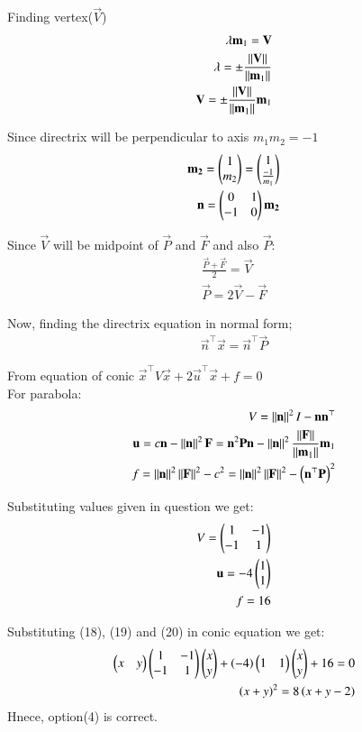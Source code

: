 \documentclass[journal]{IEEEtran}
\begin{document}
Finding vertex($\vec{V}$)
\begin{align}
    \lambda\mathbf{m}_1=\mathbf{V}\\
    \lambda = \pm\frac{\left\lVert\mathbf{V}\right\rVert}{\left\lVert\mathbf{m}_1\right\rVert}\\
    \mathbf{V} = \pm\frac{\left\lVert\mathbf{V}\right\rVert}{\left\lVert\mathbf{m}_1\right\rVert}\mathbf{m}_1
\end{align}

Since directrix will be perpendicular to axis $m_1m_2=-1$
\begin{align}
    \mathbf{m_2} = \begin{pmatrix}1\\m_2\end{pmatrix} = \begin{pmatrix}1\\ \frac{-1}{m_1}\end{pmatrix}\\
    \mathbf{n} = \begin{pmatrix}0&1\\-1&0\end{pmatrix}\mathbf{m_2}
\end{align}

Since $\vec{V}$ will be midpoint of $\vec{P}$ and $\vec{F}$ and also $\vec{P}$:
\begin{align}
    \frac{\vec{P}+\vec{F}}{2} = \vec{V}\\
    \vec{P}=2\vec{V}-\vec{F}
\end{align}

Now, finding the directrix equation in normal form;
\begin{align}
    \vec{n}^\top\vec{x}=\vec{n}^\top\vec{P}
\end{align}

From equation of conic $\vec{x}^\top V\vec{x}+2\vec{u}^\top\vec{x}+f=0$\\
For parabola:
\begin{align}
    V=\left\lVert\mathbf{n}\right\rVert^2I-\mathbf{n}\mathbf{n}^\top\\
    \mathbf{u}=c\mathbf{n}-\left\lVert\mathbf{n}\right\rVert^2\mathbf{F}=\mathbf{n}^2\mathbf{P}\mathbf{n}-\left\lVert\mathbf{n}\right\rVert^2\frac{\left\lVert\mathbf{F}\right\rVert}{\left\lVert\mathbf{m}_1\right\rVert}\mathbf{m}_1\\
    f=\left\lVert\mathbf{n}\right\rVert^2\left\lVert\mathbf{F}\right\rVert^2-c^2=\left\lVert\mathbf{n}\right\rVert^2\left\lVert\mathbf{F}\right\rVert^2-\left(\mathbf{n}^\top\mathbf{P}\right)^2
\end{align}

Substituting values given in question we get:
\begin{align}
    V=\begin{pmatrix}1&-1\\-1&1\end{pmatrix}\\
    \mathbf{u}=-4\begin{pmatrix}1\\1\end{pmatrix}\\
    f=16
\end{align}

Substituting (18), (19) and (20) in conic equation we get:
\begin{align}
    \begin{pmatrix}x&y\end{pmatrix}\begin{pmatrix}1&-1\\-1&1\end{pmatrix}\begin{pmatrix}x\\y\end{pmatrix}+\left(-4\right)\begin{pmatrix}1&1\end{pmatrix}\begin{pmatrix}x\\y\end{pmatrix}+16=0\\
    \left(x+y\right)^2=8\left(x+y-2\right)
\end{align}
Hnece, option(4) is correct.
\end{document}
